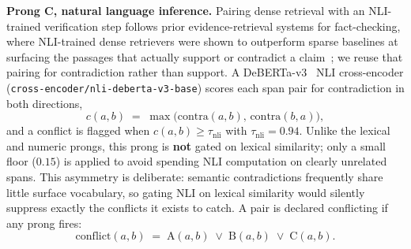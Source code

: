 \documentclass[conference]{IEEEtran}
\begin{document}
\textbf{Prong C, natural language inference.} Pairing dense retrieval with an
NLI-trained verification step follows prior evidence-retrieval systems for
fact-checking, where NLI-trained dense retrievers were shown to outperform
sparse baselines at surfacing the passages that actually support or
contradict a claim~\cite{samarinas2020latent}; we reuse that pairing for
contradiction rather than support. A DeBERTa-v3~\cite{he2021deberta}
NLI cross-encoder (\texttt{cross-encoder/nli-deberta-v3-base}) scores each
span pair for contradiction in both directions,
\begin{equation}
c(a,b) \;=\; \max\bigl(\mathrm{contra}(a,b),\,\mathrm{contra}(b,a)\bigr),
\label{eq:nli}
\end{equation}
and a conflict is flagged when $c(a,b) \geq \tau_{\text{nli}}$ with
$\tau_{\text{nli}} = 0.94$. Unlike the lexical and numeric prongs, this
prong is \textbf{not} gated on lexical similarity; only a small floor
($0.15$) is applied to avoid spending NLI computation on clearly unrelated
spans. This asymmetry is deliberate: semantic contradictions frequently
share little surface vocabulary, so gating NLI on lexical similarity would
silently suppress exactly the conflicts it exists to catch. A pair is
declared conflicting if any prong fires:
\begin{equation}
\mathrm{conflict}(a,b) \;=\;
\mathrm{A}(a,b)\;\vee\;\mathrm{B}(a,b)\;\vee\;\mathrm{C}(a,b).
\label{eq:conflict}
\end{equation}
\end{document}
